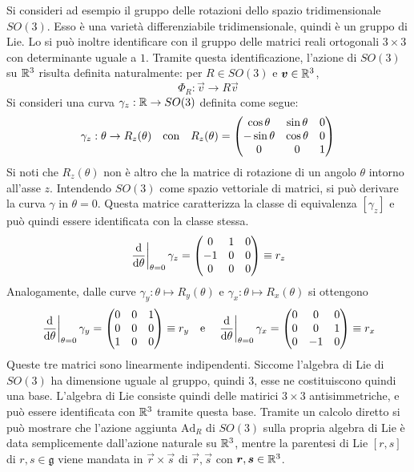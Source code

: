 Si consideri ad esempio il gruppo delle rotazioni dello spazio tridimensionale $SO(3)$. Esso è una varietà differenziabile tridimensionale, quindi è un gruppo di Lie. Lo si può inoltre identificare con il gruppo delle matrici reali ortogonali $3\times 3$ con determinante uguale a $1$. Tramite questa identificazione, l'azione di $SO(3)$ su $\mathbb{R}^3$ risulta definita naturalmente: per $R \in SO(3)$ e $\boldsymbol{v} \in \mathbb{R}^3$, 
\begin{equation*}
\Phi_R: \vec{v}\to R\vec{v}
\end{equation*} 
Si consideri una curva $\gamma_z: \mathbb{R} \to SO(3)$ definita come segue:
\begin{equation*}
\gamma_z: \theta \to R_z(\theta) \qqtext{con} R_z(\theta) = \pmqty{\cos \theta & \sin \theta & 0 \\ -\sin \theta & \cos \theta & 0 \\ 0 & 0 & 1}
\end{equation*}
Si noti che $R_z(\theta)$ non è altro che la matrice di rotazione di un angolo $\theta$ intorno all'asse $z$. Intendendo $SO(3)$ come spazio vettoriale di matrici, si può derivare la curva $\gamma$ in $\theta=0$. Questa matrice caratterizza la classe di equivalenza $[\gamma_z]$ e può quindi essere identificata con la classe stessa. 
\begin{equation*}
\eval{\dv{\theta}}_{\theta=0}\gamma_z = \pmqty{0 & 1 & 0 \\ -1 & 0 & 0 \\ 0 & 0 & 0} \defeq r_z
\end{equation*}
Analogamente, dalle curve $\gamma_y: \theta\mapsto R_y(\theta)$ e $\gamma_x: \theta \mapsto R_x(\theta)$ si ottengono 
\begin{equation*}
  \eval{\dv{\theta}}_{\theta=0}\gamma_y = \pmqty{0 & 0 & 1 \\ 0 & 0 & 0 \\ 1 & 0 & 0} \defeq r_y \qqtext{e} \eval{\dv{\theta}}_{\theta=0}\gamma_x = \pmqty{0 & 0 & 0 \\ 0 & 0 & 1 \\ 0 & -1 & 0} \defeq r_x
\end{equation*}
Queste tre matrici sono linearmente indipendenti. Siccome l'algebra di Lie di $SO(3)$ ha dimensione uguale al gruppo, quindi $3$, esse ne costituiscono quindi una base. L'algebra di Lie consiste quindi delle matirici $3\times 3$ antisimmetriche, e può essere identificata con $\mathbb{R}^3$ tramite questa base. Tramite un calcolo diretto si può mostrare che l'azione aggiunta $\mathrm{Ad}_R$ di $SO(3)$ sulla propria algebra di Lie è data semplicemente dall'azione naturale su $\mathbb{R}^3$, mentre la parentesi di Lie $[r,s]$ di $r,s \in \mathfrak{g}$ viene mandata in $\vec{r} \times \vec{s}$ di $\vec{r},\vec{s}$ con $\boldsymbol{r},\boldsymbol{s} \in \mathbb{R}^3$. 

